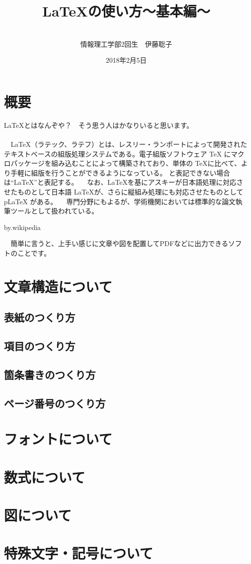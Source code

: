\documentclass[a4j]{jarticle}
\begin{document}
\begin{titlepage}
\title{\LaTeX の使い方～基本編～}
\author{
\\
情報理工学部2回生　伊藤聡子　\\
}
\date{2018年2月5日}
\maketitle
\thispagestyle{empty}
\newpage
\end{titlepage}

\tableofcontents
\newpage

\section{概要}
\LaTeX とはなんぞや？　そう思う人はかなりいると思います。\\
\\
　\LaTeX （ラテック、ラテフ）とは、レスリー・ランポートによって開発されたテキストベースの組版処理システムである。電子組版ソフトウェア TeX にマクロパッケージを組み込むことによって構築されており、単体の \TeX に比べて、より手軽に組版を行うことができるようになっている。 と表記できない場合は“\LaTeX ”と表記する。
　なお、\LaTeX を基にアスキーが日本語処理に対応させたものとして日本語 \LaTeX が、さらに縦組み処理にも対応させたものとして pLaTeX がある。
　専門分野にもよるが、学術機関においては標準的な論文執筆ツールとして扱われている。
\begin{flushright}
 by.wikipedia
\end{flushright}
　簡単に言うと、上手い感じに文章や図を配置してPDFなどに出力できるソフトのことです。

\section{文章構造について}
\subsection{表紙のつくり方}
\subsection{項目のつくり方}
\subsection{箇条書きのつくり方}
\subsection{ページ番号のつくり方}
\section{フォントについて}
\section{数式について}
\section{図について}
\section{特殊文字・記号について}
\end{document}
